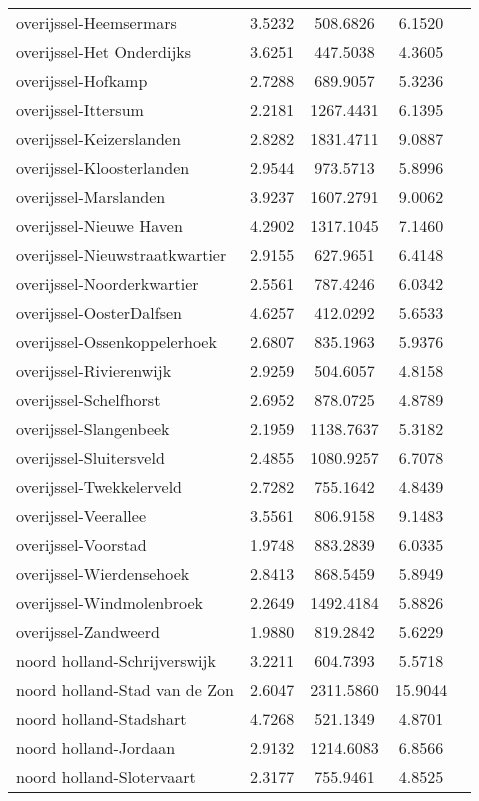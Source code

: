 \begin{longtable}{llccc}
overijssel-Heemsermars & 3.5232 & 508.6826 & 6.1520 \\
overijssel-Het Onderdijks & 3.6251 & 447.5038 & 4.3605 \\
overijssel-Hofkamp & 2.7288 & 689.9057 & 5.3236 \\
overijssel-Ittersum & 2.2181 & 1267.4431 & 6.1395 \\
overijssel-Keizerslanden & 2.8282 & 1831.4711 & 9.0887 \\
overijssel-Kloosterlanden & 2.9544 & 973.5713 & 5.8996 \\
overijssel-Marslanden & 3.9237 & 1607.2791 & 9.0062 \\
overijssel-Nieuwe Haven & 4.2902 & 1317.1045 & 7.1460 \\
overijssel-Nieuwstraatkwartier & 2.9155 & 627.9651 & 6.4148 \\
overijssel-Noorderkwartier & 2.5561 & 787.4246 & 6.0342 \\
overijssel-OosterDalfsen & 4.6257 & 412.0292 & 5.6533 \\
overijssel-Ossenkoppelerhoek & 2.6807 & 835.1963 & 5.9376 \\
overijssel-Rivierenwijk & 2.9259 & 504.6057 & 4.8158 \\
overijssel-Schelfhorst & 2.6952 & 878.0725 & 4.8789 \\
overijssel-Slangenbeek & 2.1959 & 1138.7637 & 5.3182 \\
overijssel-Sluitersveld & 2.4855 & 1080.9257 & 6.7078 \\
overijssel-Twekkelerveld & 2.7282 & 755.1642 & 4.8439 \\
overijssel-Veerallee & 3.5561 & 806.9158 & 9.1483 \\
overijssel-Voorstad & 1.9748 & 883.2839 & 6.0335 \\
overijssel-Wierdensehoek & 2.8413 & 868.5459 & 5.8949 \\
overijssel-Windmolenbroek & 2.2649 & 1492.4184 & 5.8826 \\
overijssel-Zandweerd & 1.9880 & 819.2842 & 5.6229 \\
noord holland-Schrijverswijk & 3.2211 & 604.7393 & 5.5718 \\
noord holland-Stad van de Zon & 2.6047 & 2311.5860 & 15.9044 \\
noord holland-Stadshart & 4.7268 & 521.1349 & 4.8701 \\
noord holland-Jordaan & 2.9132 & 1214.6083 & 6.8566 \\
noord holland-Slotervaart & 2.3177 & 755.9461 & 4.8525 \\

\end{longtable}
